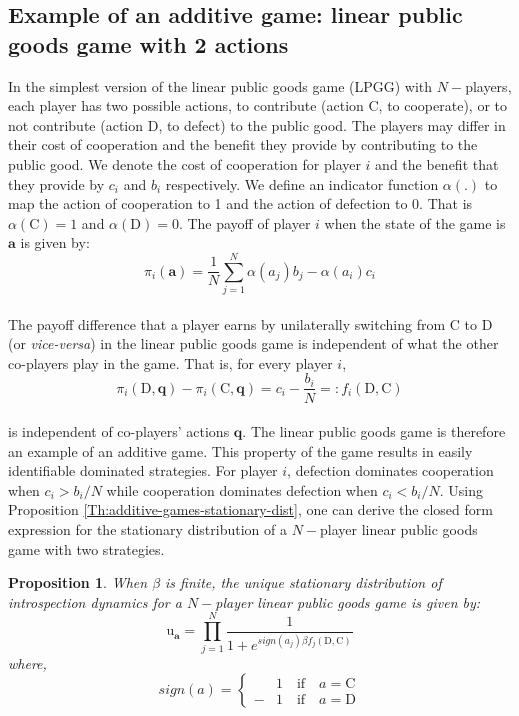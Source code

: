 \documentclass[11pt]{article}
\theoremstyle{plainCl1}
\newtheorem{Prop}{Proposition}
\theoremstyle{plainCl2}
\newcommand{\abf}{\mathbf{a}}
\newcommand{\qbf}{\mathbf{q}}
\newcommand{\C}{\mathrm{C}}
\newcommand{\D}{\mathrm{D}}
\begin{document}
\subsection{Example of an additive game: linear public goods game with 2 actions}
In the simplest version of the linear public goods game (LPGG) with $N-$players, each player has two possible actions, to contribute (action $\C$, to cooperate), or to not contribute (action $\D$, to defect) to the public good. The players may differ in their cost of cooperation and the benefit they provide by contributing to the public good. We denote the cost of cooperation for player $i$ and the benefit that they provide by $c_i$ and $b_i$ respectively. We define an indicator function $\alpha(.)$ to map the action of cooperation to 1 and the action of defection to 0. That is $\alpha(\C) = 1$ and $\alpha(\D) = 0$.  The payoff of player $i$ when the state of the game is $\abf$ is given by: \\
\begin{equation}
\pi_i(\abf) = \frac{1}{N}\sum_{j=1}^N \displaystyle \alpha(a_j) b_j - \alpha(a_i) c_i
\label{Eq:linear-pgg-payoff}
\end{equation}
\\
\noindent The payoff difference that a player earns by unilaterally switching from $\C$ to $\D$ (or \emph{vice-versa}) in the linear public goods game is independent of what the other co-players play in the game. That is, for every player $i$,
\begin{equation}
\pi_i(\D, \qbf) - \pi_i(\C, \qbf) = c_i - \frac{b_i}{N} =: f_i(\D, \C) 
\label{Eq:difference-payoffs-lpgg}
\end{equation}\\
\noindent is independent of co-players' actions $\qbf$. The linear public goods game is therefore an example of an additive game. This property of the game results in easily identifiable dominated strategies. For player $i$, defection dominates cooperation when $c_i > b_i/N$ while cooperation dominates defection when $c_i < b_i/N$. Using Proposition \ref{Th:additive-games-stationary-dist}, one can derive the closed form expression for the stationary distribution of a $N-$player linear public goods game with two strategies. 
\begin{Prop}
\label{prop:stationary-dist-lpgg}
When $\beta$ is finite, the unique stationary distribution of introspection dynamics for a $N-$player linear public goods game is given by: 
\\
\begin{equation}
\mathrm{u}_\abf = \prod_{j = 1}^{N} \frac{1}{1 + \displaystyle e^{\mathit{sign}(a_j)\beta f_j(\D, \C )}} 
\label{Eq:stationary_dist_lpgg}
\end{equation}
where, 
\begin{equation}
\label{Eq:sign-function}
\mathit{sign}(a) =
\begin{cases}
&1 \quad \text{if} \quad a = \C \\
-&1 \quad \text{if} \quad a = \D
\end{cases}
\end{equation} \\
\end{Prop}
\end{document}
